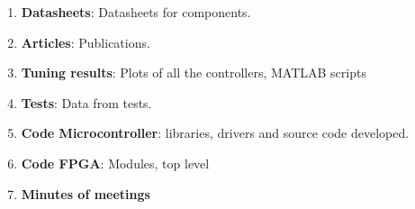 \documentclass[../../main.tex]{subfiles}
\begin{document}
\begin{enumerate}
    \item \textbf{Datasheets}: Datasheets for components.
    \item \textbf{Articles}: Publications.
    \item \textbf{Tuning results}: Plots of all the controllers, MATLAB scripts
    \item \textbf{Tests}: Data from tests.
    \item \textbf{Code Microcontroller}: libraries, drivers and source code developed.
    \item \textbf{Code FPGA}: Modules, top level
    \item \textbf{Minutes of meetings}
\end{enumerate}        
\end{document}
